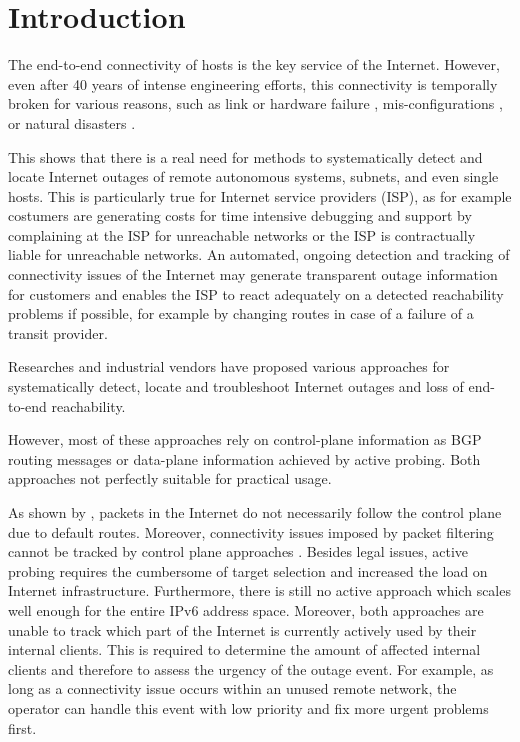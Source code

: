 

\chapter{Introduction}

The end-to-end connectivity of hosts is the key service of the Internet. However, even after 40 years of intense engineering efforts, this connectivity is temporally broken for various reasons, such as link or hardware failure \citep{Markopoulou:2008}, mis-configurations \citep{Mahajan:2002}, or natural disasters \citep{Dainotti:2012:EBH,Schulman:2011}. 

This shows that there is a real need for methods to systematically detect and locate Internet outages of remote autonomous systems, subnets, and even single hosts. This is particularly true for Internet service providers (ISP), as for example costumers are generating costs for time intensive debugging and support by complaining at the ISP for unreachable networks or the ISP is contractually liable for unreachable networks. An automated, ongoing detection and tracking of connectivity issues of the Internet may generate transparent outage information for customers and enables the ISP to react adequately on a detected reachability problems if possible, for example by changing routes in case of a failure of a transit provider. 

Researches and industrial vendors have proposed various approaches for systematically detect, locate and troubleshoot Internet outages and loss of end-to-end reachability.

However, most of these approaches rely on control-plane information as BGP routing messages or data-plane information achieved by active probing. Both approaches not perfectly suitable for practical usage.

As shown by \citet{Bush:Optometry}, packets in the Internet do not necessarily follow the control plane due to default routes. Moreover, connectivity issues imposed by packet filtering cannot be tracked by control plane approaches \citep{Dainotti:2011:ACI}. Besides legal issues, active probing requires the cumbersome of target selection and increased the load on Internet infrastructure. Furthermore, there is still no active approach which scales well enough for the entire IPv6 address space. Moreover, both approaches are unable to track which part of the Internet is currently actively used by their internal clients. This is required to determine the amount of affected internal clients and therefore to assess the urgency of the outage event. For example, as long as a connectivity issue occurs within an unused remote network, the operator can handle this event with low priority and fix more urgent problems first.


